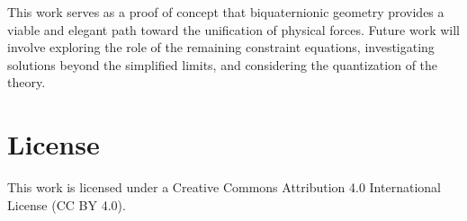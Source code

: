 \documentclass[11pt, a4paper]{article}
\begin{document}
This work serves as a proof of concept that biquaternionic geometry provides a viable and elegant path toward the unification of physical forces. Future work will involve exploring the role of the remaining constraint equations, investigating solutions beyond the simplified limits, and considering the quantization of the theory.


\section*{License}
This work is licensed under a Creative Commons Attribution 4.0 International License (CC BY 4.0).
\end{document}
